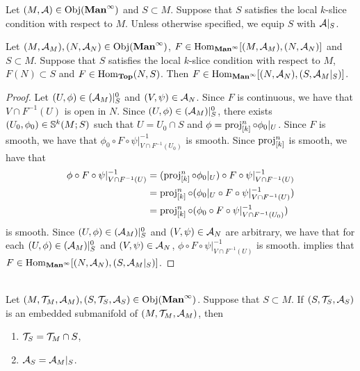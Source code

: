 \documentclass{book}
\begin{document}
	\begin{note}
		Let $(M, \MA) \in \Obj(\Maninf)$ and $S \subset M$. Suppose that $S$ satisfies the local $k$-slice condition with respect to $M$. Unless otherwise specified, we equip $S$ with $\MA|_S$.
	\end{note}

	\begin{ex}
		Let $(M, \MA_M), (N, \MA_N) \in \Obj(\Maninf)$, $F \in \Hom_{\Maninf}[(M, \MA_M), (N, \MA_N)]$ and $S \subset M$. Suppose that $S$ satisfies the local $k$-slice condition with respect to $M$, $F(N) \subset S$ and $F \in \Hom_{\Top}(N, S)$. Then $F \in \Hom_{\Maninf}[(N, \MA_N), (S, \MA_M|_S)]$.
	\end{ex}
	
	\begin{proof}
		Let $(U, \phi) \in (\MA_M)|_S^0$ and $(V, \psi) \in \MA_N$. Since $F$ is continuous, we have that $V \cap F^{-1}(U)$ is open in $N$. Since $(U, \phi) \in (\MA_M)|_S^0$, there exists $(U_0, \phi_0) \in \S^k(M;S)$ such that $U = U_0 \cap S$ and $\phi = \prj^n_{[k]} \circ \phi_0|_{U}$. Since $F$ is smooth, we have that $\phi_0 \circ F \circ  \psi|_{V \cap F^{-1}(U_0)}^{-1}$ is smooth. Since $\prj^n_{[k]}$ is smooth, we have that
		\begin{align*}
			\phi \circ F \circ \psi|_{V \cap F^{-1}(U)}^{-1}
			& = (\prj^n_{[k]} \circ \phi_0|_U) \circ F \circ \psi|_{V \cap F^{-1}(U)}^{-1} \\
			& = \prj^n_{[k]} \circ (\phi_0|_U \circ F \circ  \psi|_{V \cap F^{-1}(U)}^{-1}) \\
			& = \prj^n_{[k]} \circ (\phi_0 \circ F \circ  \psi|_{V \cap F^{-1}(U_0)}^{-1}) 
 		\end{align*}
 		is smooth. Since $(U, \phi) \in (\MA_M)|_S^0$ and $(V, \psi) \in \MA_N$ are arbitrary, we have that for each $(U, \phi) \in (\MA_M)|_S^0$ and $(V, \psi) \in \MA_N$,  $\phi \circ F \circ \psi|_{V \cap F^{-1}(U)}^{-1}$ is smooth.  implies that $F \in \Hom_{\Maninf}[(N, \MA_N), (S, \MA_M|_S)]$.  
	\end{proof}

	\begin{ex}  \\
		Let $(M, \MT_M, \MA_M), (S, \MT_S, \MA_S) \in \Obj(\Maninf)$. Suppose that $S \subset M$. If $(S, \MT_S, \MA_S)$ is an embedded submanifold of $(M, \MT_M, \MA_M)$, then 
		\begin{enumerate}
			\item $\MT_S = \MT_M \cap S$,
			\item $\MA_S = \MA_M|_S$.
		\end{enumerate}
	\end{ex}
\end{document}
